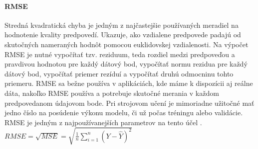 \paragraph{RMSE} Stredná kvadratická chyba je jedným z najčastejšie používaných meradiel na hodnotenie kvality predpovedí. Ukazuje, ako vzdialene predpovede padajú od skutočných nameraných hodnôt pomocou euklidovskej vzdialenosti. Na výpočet RMSE je nutné vypočítať tzv. reziduum, teda rozdiel medzi predpoveďou a pravdivou hodnotou pre každý dátový bod, vypočítať normu rezidua pre každý dátový bod, vypočítať priemer rezíduí a vypočítať druhú odmocninu tohto priemeru. RMSE sa bežne používa v aplikáciách, kde máme k dispozícii aj reálne dáta, nakoľko RMSE používa a potrebuje skutočné merania v každom predpovedanom údajovom bode. Pri strojovom učení je mimoriadne užitočné mať jedno číslo na posúdenie výkonu modelu, či už počas tréningu alebo validácie. RMSE je jedným z najpoužívanejších parametrov na tento účel \cite{rmse}. \newline
$RMSE = \sqrt{MSE} = \sqrt{\frac{1}{n}\sum_{i=1}^{n}(Y-\widehat{Y})^{2}}$

\newpage

